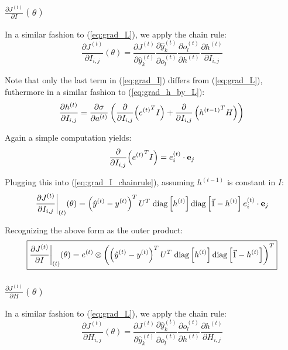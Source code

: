 \subsubsection[short]{$ \frac{\partial J^{(t)}}{\partial I}(\theta) $}

In a similar fashion to (\ref{eq:grad_L}), we apply the chain rule:
\begin{equation} \label{eq:grad_I_chainrule}
  \frac{\partial J^{(t)}}{\partial I_{i,j}}(\theta) = \frac{\partial J^{(t)}}{\partial \hat{y}_k^{(t)}} \frac{{\partial \hat{y}_k^{(t)}}}{\partial o_l^{(t)}} \frac{\partial o_l^{(t)}}{\partial h^{(t)}} \frac{\partial h^{(t)}}{\partial I_{i,j}} 
\end{equation}

Note that only the last term in (\ref{eq:grad_I}) differs from (\ref{eq:grad_L}), futhermore in a similar fashion to (\ref{eq:grad_h_by_L}):
\begin{equation} \label{eq:grad_h_by_I}
  \frac{\partial h^{(t)}}{\partial I_{i,j}} = \frac{\partial \sigma}{\partial a^{(t)}} \left( \frac{\partial}{\partial I_{i,j}} { \left({e^{(t)}}^T I \right)}  + \frac{\partial }{\partial I_{i,j}} \left( {h^{(t-1)}}^T H \right) \right) \\
\end{equation}

Again a simple computation yields:
\begin{equation}
  \frac{\partial}{\partial I_{i,j}} { \left({e^{(t)}}^T I \right)} = e^{(t)}_i \cdot \textbf{\text{e}}_j
\end{equation}

Plugging this into (\ref{eq:grad_I_chainrule}), assuming $h^{(t-1)}$ is constant in $I$:
\begin{equation} \label{eq:grad_I_ij}
  \restr{\frac{\partial J^{(t)}}{\partial I_{i,j}}}{(t)}(\theta) = \left(\hat{y}^{(t)} - y^{(t)}\right)^T U^T \; \text{diag}\left[ h^{(t)} \right]  \text{diag}\left[ \vec{1} - h^{(t)} \right] e^{(t)}_i \cdot \textbf{\text{e}}_j
\end{equation}

Recognizing the above form as the outer product:
\begin{equation} \label{eq:grad_I}
  \boxed{ \restr{\frac{\partial J^{(t)}}{\partial I}}{(t)}(\theta) = e^{(t)} \otimes \left(\left(\hat{y}^{(t)} - y^{(t)}\right)^T U^T \; \text{diag}\left[ h^{(t)} \right]  \text{diag}\left[ \vec{1} - h^{(t)} \right] \right)^T }
\end{equation}


\subsubsection[short]{$ \frac{\partial J^{(t)}}{\partial H}(\theta) $}
In a similar fashion to (\ref{eq:grad_L}), we apply the chain rule:
\begin{equation} \label{eq:grad_H_chainrule}
  \frac{\partial J^{(t)}}{\partial H_{i,j}}(\theta) = \frac{\partial J^{(t)}}{\partial \hat{y}_k^{(t)}} \frac{{\partial \hat{y}_k^{(t)}}}{\partial o_l^{(t)}} \frac{\partial o_l^{(t)}}{\partial h^{(t)}} \frac{\partial h^{(t)}}{\partial H_{i,j}} 
\end{equation}

